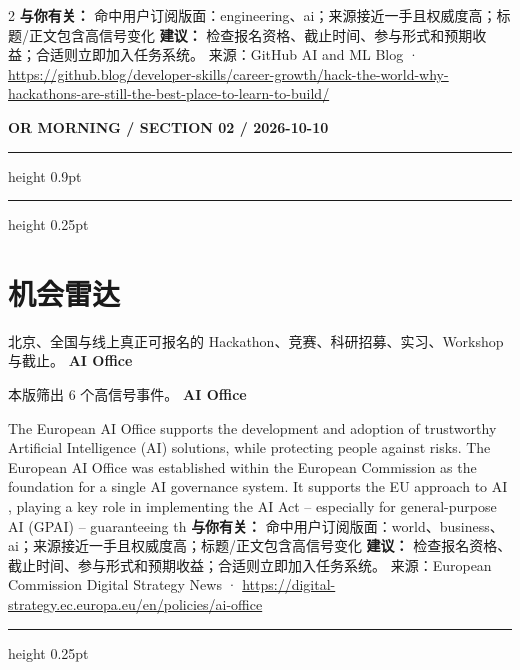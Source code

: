 \documentclass[10.5pt]{ctexart}
\begin{document}
\begin{multicols}{2}
\textbf{与你有关：} 命中用户订阅版面：engineering、ai；来源接近一手且权威度高；标题/正文包含高信号变化
\textbf{建议：} 检查报名资格、截止时间、参与形式和预期收益；合适则立即加入任务系统。
{\footnotesize\color{ormuted} 来源：GitHub AI and ML Blog · \url{https://github.blog/developer-skills/career-growth/hack-the-world-why-hackathons-are-still-the-best-place-to-learn-to-build/}}
\end{multicols}
\newpage
{\small\bfseries OR MORNING / SECTION 02 / 2026-10-10}
\vspace{2mm}
\hrule height 0.9pt
\vspace{1.5mm}
\hrule height 0.25pt
\vspace{4mm}
\section*{机会雷达}
{\color{ormuted} 北京、全国与线上真正可报名的 Hackathon、竞赛、科研招募、实习、Workshop 与截止。}
\vspace{2mm}
{\LARGE\bfseries AI Office}\par
\vspace{1mm}
{\color{ormuted} 本版筛出 6 个高信号事件。}
\vspace{3mm}
{\Large\bfseries AI Office}\par
The European AI Office supports the development and adoption of trustworthy Artificial Intelligence (AI) solutions, while protecting people against risks. The European AI Office was established within the European Commission as the foundation for a single AI governance system. It supports the EU approach to AI , playing a key role in implementing the AI Act – especially for general-purpose AI (GPAI) – guaranteeing th
\textbf{与你有关：} 命中用户订阅版面：world、business、ai；来源接近一手且权威度高；标题/正文包含高信号变化
\textbf{建议：} 检查报名资格、截止时间、参与形式和预期收益；合适则立即加入任务系统。
{\footnotesize\color{ormuted} 来源：European Commission Digital Strategy News · \url{https://digital-strategy.ec.europa.eu/en/policies/ai-office}}
\vspace{4mm}
\hrule height 0.25pt
\vspace{3mm}
\end{document}
